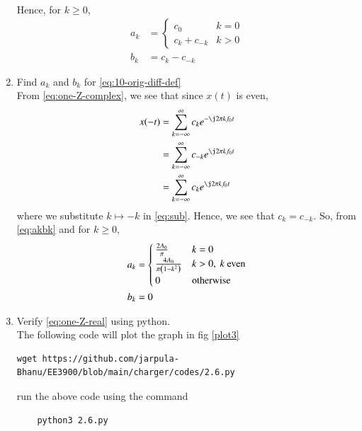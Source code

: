 \documentclass[journal,12pt,twocolumn]{IEEEtran}
\renewcommand\thesection{\arabic{section}}
\begin{document}
\begin{enumerate}[label=\thesection.\arabic*,ref=\thesection.\theenumi]
\begin{align}
	\end{align}
	Hence, for $k \ge 0$,
	\begin{align}
		a_k &= 
		\begin{cases}
			c_0 & k = 0 \\
			c_k + c_{-k} & k > 0
		\end{cases} \\
		b_k &= c_k - c_{-k}
		\label{eq:akbk}
	\end{align}
	\item Find $a_k$ and $b_k$ for 
	\eqref{eq:10-orig-diff-def}\\
	\solution From \eqref{eq:one-Z-complex}, we see that since $x(t)$ is even,
	\begin{align}
		x(-t) &= \sum_{k = -\infty}^{\infty}c_ke^{-\j2\pi kf_0 t} \\
		&= \sum_{k = -\infty}^{\infty}c_{-k}e^{\j2\pi kf_0t} \label{eq:sub} \\
		&= \sum_{k = -\infty}^{\infty}c_ke^{\j2\pi kf_0 t}
	\end{align}
	where we substitute $k \mapsto -k$ in \eqref{eq:sub}. Hence, we see that 
	$c_k = c_{-k}$. So, from \eqref{eq:akbk} and for $k \ge 0$,
	\begin{align}
		a_k &= 
		\begin{cases}
			\frac{2A_0}{\pi} & k = 0 \\
			\frac{4A_0}{\pi\brak{1 - k^2}} & k > 0,\ k\ \text{even} \\
			0 & \text{otherwise}
		\end{cases} \\
		b_k &= 0
		\label{eq:akbk-even}
	\end{align}
	\item Verify
	\eqref{eq:one-Z-real}
	using python.\\
	\solution The following code will plot the graph in fig \eqref{plot3}
	\begin{lstlisting}
wget https://github.com/jarpula-Bhanu/EE3900/blob/main/charger/codes/2.6.py
	\end{lstlisting}
	run the above code using the command
	\begin{lstlisting}
	python3 2.6.py
	\end{lstlisting}
	\begin{figure}[!ht]

\end{figure}
\end{enumerate}
\end{document}

